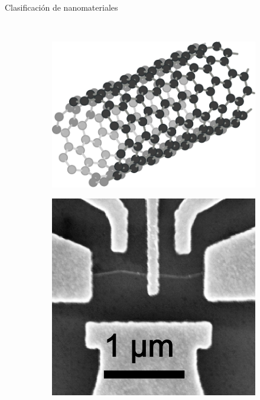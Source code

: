 \documentclass[aspectratio=169]{beamer}
\begin{document}
\begin{frame}{Clasificación de nanomateriales}
\begin{figure}
			\\
			\begin{subfigure}[b]{0.15\textwidth}
				\includegraphics[width=\textwidth]{cnt_structure.pdf}
				\caption{}
				\label{fig:cnt_struct}
			\end{subfigure}
			\begin{subfigure}[b]{0.15\textwidth}
				\includegraphics[width=\textwidth]{cnt_image.png}
				\caption{}
				\label{fig:cnt_image}
			\end{subfigure}
			\begin{subfigure}[b]{0.15\textwidth}

\end{subfigure}
\end{figure}
\end{frame}
\end{document}
